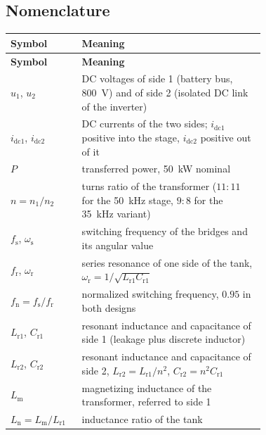 \documentclass[12pt,a4paper]{scrartcl}
\newcommand{\ped}[1]{_{\mathrm{#1}}}
\begin{document}


\tableofcontents
\listoffigures
\listoftables
\newpage

\begin{onehalfspace}

\section*{Nomenclature}
\label{sec:nomenclature}

\begingroup
{}
\begin{longtable}{@{} l p{0.72\linewidth} @{}}
	\toprule
	\textbf{Symbol} & \textbf{Meaning} \\
	\midrule
	\endfirsthead
	\toprule
	\textbf{Symbol} & \textbf{Meaning} \\
	\midrule
	\endhead
	\bottomrule
	\endfoot
	\bottomrule
	\endlastfoot
	$u\ped{1}$, $u\ped{2}$ & DC voltages of side 1 (battery bus, \SI{800}{\volt}) and of side 2 (isolated DC link of the inverter) \\
	$i\ped{dc1}$, $i\ped{dc2}$ & DC currents of the two sides; $i\ped{dc1}$ positive into the stage, $i\ped{dc2}$ positive out of it \\
	$P$ & transferred power, \SI{50}{\kilo\watt} nominal \\
	$n = n\ped{1}/n\ped{2}$ & turns ratio of the transformer ($11:11$ for the \SI{50}{\kilo\hertz} stage, $9:8$ for the \SI{35}{\kilo\hertz} variant) \\
	$f\ped{s}$, $\omega\ped{s}$ & switching frequency of the bridges and its angular value \\
	$f\ped{r}$, $\omega\ped{r}$ & series resonance of one side of the tank, $\omega\ped{r} = 1/\sqrt{L\ped{r1} C\ped{r1}}$ \\
	$f\ped{n} = f\ped{s}/f\ped{r}$ & normalized switching frequency, $0.95$ in both designs \\
	$L\ped{r1}$, $C\ped{r1}$ & resonant inductance and capacitance of side 1 (leakage plus discrete inductor) \\
	$L\ped{r2}$, $C\ped{r2}$ & resonant inductance and capacitance of side 2, $L\ped{r2} = L\ped{r1}/n^2$, $C\ped{r2} = n^2 C\ped{r1}$ \\
	$L\ped{m}$ & magnetizing inductance of the transformer, referred to side 1 \\
	$L\ped{n} = L\ped{m}/L\ped{r1}$ & inductance ratio of the tank \\

\end{longtable}
\end{onehalfspace}
\end{document}
